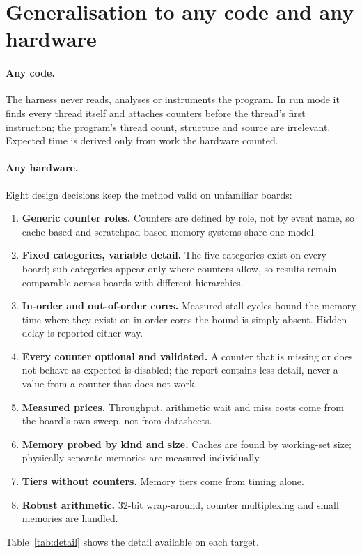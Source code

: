 \documentclass[10pt,a4paper,twocolumn]{article}
\begin{document}
\section{Generalisation to any code and any hardware}

\paragraph{Any code.} The harness never reads, analyses or instruments the program. In run mode it finds every thread itself and attaches counters before the thread's first instruction; the program's thread count, structure and source are irrelevant. Expected time is derived only from work the hardware counted.

\paragraph{Any hardware.} Eight design decisions keep the method valid on unfamiliar boards:
\begin{enumerate}
  \item \textbf{Generic counter roles.} Counters are defined by role, not by event name, so cache-based and scratchpad-based memory systems share one model.
  \item \textbf{Fixed categories, variable detail.} The five categories exist on every board; sub-categories appear only where counters allow, so results remain comparable across boards with different hierarchies.
  \item \textbf{In-order and out-of-order cores.} Measured stall cycles bound the memory time where they exist; on in-order cores the bound is simply absent. Hidden delay is reported either way.
  \item \textbf{Every counter optional and validated.} A counter that is missing or does not behave as expected is disabled; the report contains less detail, never a value from a counter that does not work.
  \item \textbf{Measured prices.} Throughput, arithmetic wait and miss costs come from the board's own sweep, not from datasheets.
  \item \textbf{Memory probed by kind and size.} Caches are found by working-set size; physically separate memories are measured individually.
  \item \textbf{Tiers without counters.} Memory tiers come from timing alone.
  \item \textbf{Robust arithmetic.} 32-bit wrap-around, counter multiplexing and small memories are handled.
\end{enumerate}
Table~\ref{tab:detail} shows the detail available on each target.
\end{document}
